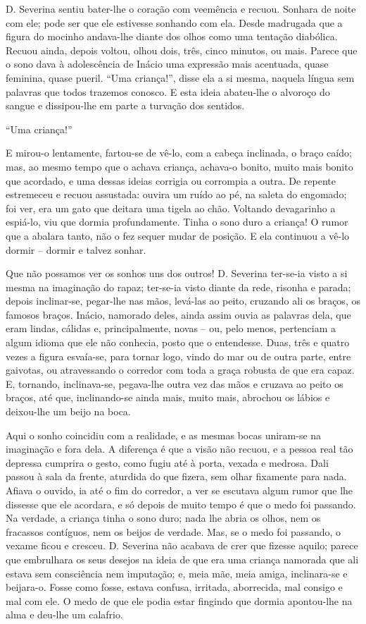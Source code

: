 D. Severina sentiu bater-lhe o coração com veemência e recuou. Sonhara
de noite com ele; pode ser que ele estivesse sonhando com ela. Desde
madrugada que a figura do mocinho andava-lhe diante dos olhos como uma
tentação diabólica. Recuou ainda, depois voltou, olhou dois, três, cinco
minutos, ou mais. Parece que o sono dava à adolescência de Inácio uma
expressão mais acentuada, quase feminina, quase pueril. ``Uma
criança!'', disse ela a si mesma, naquela língua sem palavras que todos
trazemos conosco. E esta ideia abateu-lhe o alvoroço do sangue e
dissipou-lhe em parte a turvação dos sentidos.

``Uma criança!''

E mirou-o lentamente, fartou-se de vê-lo, com a cabeça inclinada, o
braço caído; mas, ao mesmo tempo que o achava criança, achava-o bonito,
muito mais bonito que acordado, e uma dessas ideias corrigia ou
corrompia a outra. De repente estremeceu e recuou assustada: ouvira um
ruído ao pé, na saleta do engomado; foi ver, era um gato que deitara uma
tigela ao chão. Voltando devagarinho a espiá-lo, viu que dormia
profundamente. Tinha o sono duro a criança! O rumor que a abalara tanto,
não o fez sequer mudar de posição. E ela continuou a vê-lo dormir --
dormir e talvez sonhar.

Que não possamos ver os sonhos uns dos outros! D. Severina ter-se-ia
visto a si mesma na imaginação do rapaz; ter-se-ia visto diante da rede,
risonha e parada; depois inclinar-se, pegar-lhe nas mãos, levá-las ao
peito, cruzando ali os braços, os famosos braços. Inácio, namorado
deles, ainda assim ouvia as palavras dela, que eram lindas, cálidas e,
principalmente, novas -- ou, pelo menos, pertenciam a algum idioma que
ele não conhecia, posto que o entendesse. Duas, três e quatro vezes a
figura esvaía-se, para tornar logo, vindo do mar ou de outra parte,
entre gaivotas, ou atravessando o corredor com toda a graça robusta de
que era capaz. E, tornando, inclinava-se, pegava-lhe outra vez das mãos
e cruzava ao peito os braços, até que, inclinando-se ainda mais, muito
mais, abrochou os lábios e deixou-lhe um beijo na boca.

Aqui o sonho coincidiu com a realidade, e as mesmas bocas uniram-se na
imaginação e fora dela. A diferença é que a visão não recuou, e a pessoa
real tão depressa cumprira o gesto, como fugiu até à porta, vexada e
medrosa. Dali passou à sala da frente, aturdida do que fizera, sem olhar
fixamente para nada. Afiava o ouvido, ia até o fim do corredor, a ver se
escutava algum rumor que lhe dissesse que ele acordara, e só depois de
muito tempo é que o medo foi passando. Na verdade, a criança tinha o
sono duro; nada lhe abria os olhos, nem os fracassos contíguos, nem os
beijos de verdade. Mas, se o medo foi passando, o vexame ficou e
cresceu. D. Severina não acabava de crer que fizesse aquilo; parece que
embrulhara os seus desejos na ideia de que era uma criança namorada que
ali estava sem consciência nem imputação; e, meia mãe, meia amiga,
inclinara-se e beijara-o. Fosse como fosse, estava confusa, irritada,
aborrecida, mal consigo e mal com ele. O medo de que ele podia estar
fingindo que dormia apontou-lhe na alma e deu-lhe um calafrio.

